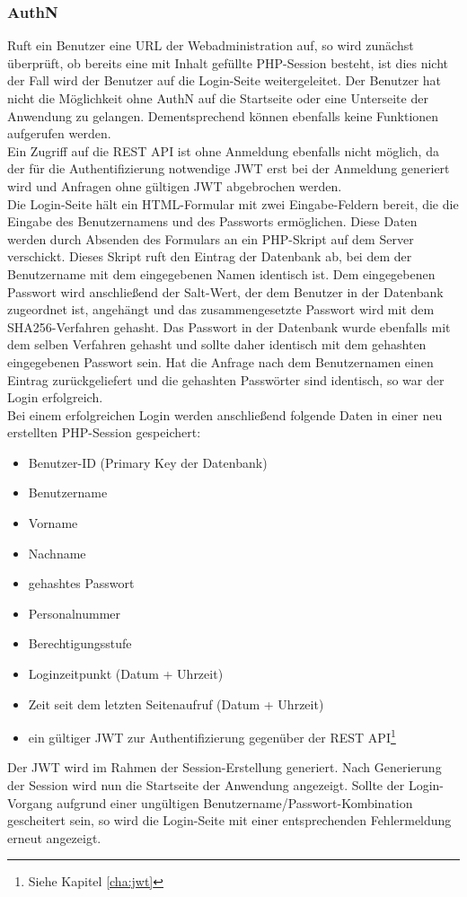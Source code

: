 \subsubsection{\acf{AuthN}}
Ruft ein Benutzer eine URL der Webadministration auf, so wird zunächst überprüft, ob bereits eine mit Inhalt gefüllte \ac{PHP}-Session besteht, ist dies nicht der Fall wird der Benutzer auf die Login-Seite weitergeleitet. Der Benutzer hat nicht die Möglichkeit ohne \acl{AuthN} auf die Startseite oder eine Unterseite der Anwendung zu gelangen. Dementsprechend können ebenfalls keine Funktionen aufgerufen werden.\\
Ein Zugriff auf die \acs{REST} \acs{API} ist ohne Anmeldung ebenfalls nicht möglich, da der für die Authentifizierung notwendige \acf{JWT} erst bei der Anmeldung generiert wird und Anfragen ohne gültigen \acs{JWT} abgebrochen werden.\\

Die Login-Seite hält ein \acs{HTML}-Formular mit zwei Eingabe-Feldern bereit, die die Eingabe des Benutzernamens und des Passworts ermöglichen. Diese Daten werden durch Absenden des Formulars an ein \acs{PHP}-Skript auf dem Server verschickt. Dieses Skript ruft den Eintrag der Datenbank ab, bei dem der Benutzername mit dem eingegebenen Namen identisch ist. Dem eingegebenen Passwort wird anschließend der Salt-Wert, der dem Benutzer in der Datenbank zugeordnet ist, angehängt und das zusammengesetzte Passwort wird mit dem SHA256-Verfahren gehasht. Das Passwort in der Datenbank wurde ebenfalls mit dem selben Verfahren gehasht und sollte daher identisch mit dem gehashten eingegebenen Passwort sein. Hat die Anfrage nach dem Benutzernamen einen Eintrag zurückgeliefert und die gehashten Passwörter sind identisch, so war der Login erfolgreich.\\
Bei einem erfolgreichen Login werden anschließend folgende Daten in einer neu erstellten \ac{PHP}-Session gespeichert:
\begin{itemize}
	\item Benutzer-ID (Primary Key der Datenbank)
	\item Benutzername
	\item Vorname
	\item Nachname
	\item gehashtes Passwort
	\item Personalnummer
	\item Berechtigungsstufe
	\item Loginzeitpunkt (Datum + Uhrzeit)
	\item Zeit seit dem letzten Seitenaufruf (Datum + Uhrzeit)
	\item ein gültiger \acs{JWT} zur Authentifizierung gegenüber der \acs{REST} \acs{API}\footnote{Siehe Kapitel \ref{cha:jwt} }
\end{itemize}
Der \acl{JWT} wird im Rahmen der Session-Erstellung generiert. Nach Generierung der Session wird nun die Startseite der Anwendung angezeigt. Sollte der Login-Vorgang aufgrund einer ungültigen Benutzername/Passwort-Kombination gescheitert sein, so wird die Login-Seite mit einer entsprechenden Fehlermeldung erneut angezeigt.\\


